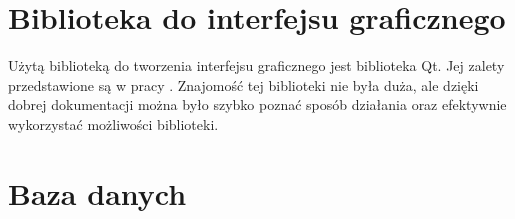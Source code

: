 \section{Biblioteka do interfejsu graficznego}
\label{sec:interfejsGraficzny}
Użytą biblioteką do tworzenia interfejsu graficznego jest biblioteka Qt. Jej zalety przedstawione są w pracy \cite{Gl11}. Znajomość tej biblioteki nie była duża, ale dzięki dobrej dokumentacji można było szybko poznać sposób działania oraz efektywnie wykorzystać możliwości biblioteki.

\section{Baza danych}
\label{sec:bazaDanych}

